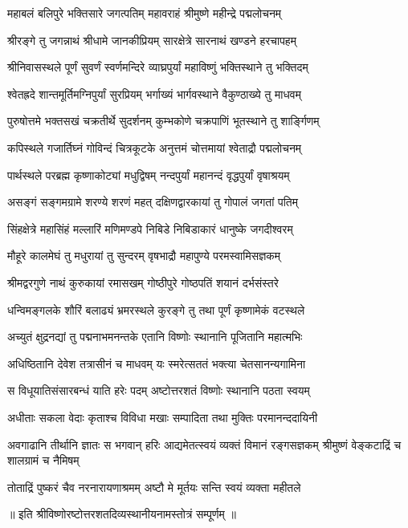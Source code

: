 \twolineshloka
{महाबलं बलिपुरे भक्तिसारे जगत्पतिम्}
{महावराहं श्रीमुष्णे महीन्द्रे पद्मलोचनम्}

\twolineshloka
{श्रीरङ्गे तु जगन्नाथं श्रीधामे जानकीप्रियम्}
{सारक्षेत्रे सारनाथं खण्डने हरचापहम्}

\twolineshloka
{श्रीनिवासस्थले पूर्णं सुवर्णं स्वर्णमन्दिरे}
{व्याघ्रपुर्यां महाविष्णुं भक्तिस्थाने तु भक्तिदम्}

\twolineshloka
{श्वेतह्रदे शान्तमूर्तिमग्निपुर्यां सुरप्रियम्}
{भर्गाख्यं भार्गवस्थाने वैकुण्ठाख्ये तु माधवम्}

\twolineshloka
{पुरुषोत्तमे भक्तसखं चक्रतीर्थे सुदर्शनम्}
{कुम्भकोणे चक्रपाणिं भूतस्थाने तु शार्ङ्गिणम्}

\twolineshloka
{कपिस्थले गजार्तिघ्नं गोविन्दं चित्रकूटके}
{अनुत्तमं चोत्तमायां श्वेताद्रौ पद्मलोचनम्}

\twolineshloka
{पार्थस्थले परब्रह्म कृष्णाकोट्यां मधुद्विषम्}
{नन्दपुर्यां महानन्दं वृद्धपुर्यां वृषाश्रयम्}

\twolineshloka
{असङ्गं सङ्गमग्रामे शरण्ये शरणं महत्}
{दक्षिणद्वारकायां तु गोपालं जगतां पतिम्}

\twolineshloka
{सिंहक्षेत्रे महासिंहं मल्लारिं मणिमण्डपे}
{निबिडे निबिडाकारं धानुष्के जगदीश्वरम्}

\twolineshloka
{मौहूरे कालमेघं तु मधुरायां तु सुन्दरम्}
{वृषभाद्रौ महापुण्ये परमस्वामिसज्ञकम्}

\twolineshloka
{श्रीमद्वरगुणे नाथं कुरुकायां रमासखम्}
{गोष्ठीपुरे गोष्ठपतिं शयानं दर्भसंस्तरे}

\twolineshloka
{धन्विमङ्गलके शौरिं बलाढ्यं भ्रमरस्थले}
{कुरङ्गे तु तथा पूर्णं कृष्णामेकं वटस्थले}

\twolineshloka
{अच्युतं क्षुद्रनद्यां तु पद्मनाभमनन्तके}
{एतानि विष्णोः स्थानानि पूजितानि महात्मभिः}

\twolineshloka
{अधिष्ठितानि देवेश तत्रासीनं च माधवम्}
{यः स्मरेत्सततं भक्त्या चेतसानन्यगामिना}

\twolineshloka
{स विधूयातिसंसारबन्धं याति हरेः पदम्}
{अष्टोत्तरशतं विष्णोः स्थानानि पठता स्वयम्}

\twolineshloka
{अधीताः सकला वेदाः कृताश्च विविधा मखाः}
{सम्पादिता तथा मुक्तिः परमानन्ददायिनी}

\threelineshloka
{अवगाढानि तीर्थानि ज्ञातः स भगवान् हरिः}
{आद्यमेतत्स्वयं व्यक्तं विमानं रङ्गसज्ञकम्}
{श्रीमुष्णं वेङ्कटाद्रिं च शालग्रामं च नैमिषम्}

\twolineshloka
{तोताद्रिं पुष्करं चैव नरनारायणाश्रमम्}
{अष्टौ मे मूर्तयः सन्ति स्वयं व्यक्ता महीतले}

{॥ इति श्रीविष्णोरष्टोत्तरशतदिव्यस्थानीयनामस्तोत्रं सम्पूर्णम् ॥}